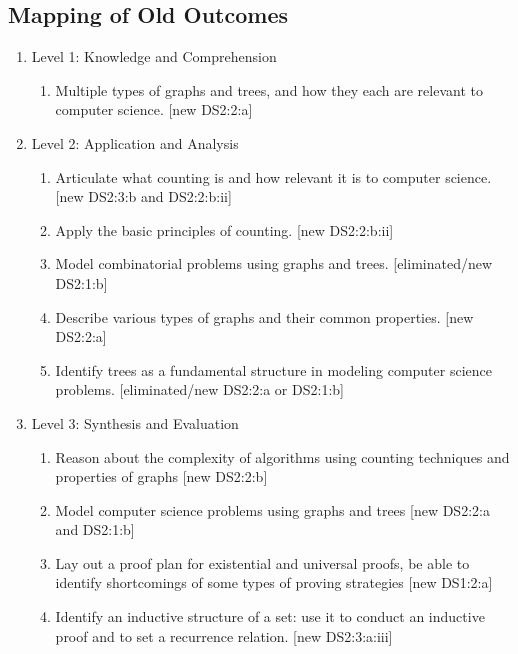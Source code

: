 \documentclass[11pt]{article}
\begin{document}
\begin{appendix}
\clearpage
\section{Mapping of Old Outcomes}
\label{app:oldOutcomeMapping}
\begin{enumerate}
\item Level 1: Knowledge and Comprehension 
	\begin{enumerate}
	\item Multiple types of graphs and trees, and how they each are relevant to computer science. {\color{red}[new DS2:2:a]}
	\end{enumerate}
\item Level 2: Application and Analysis 
	\begin{enumerate}
	\item Articulate what counting is and how relevant it is to computer science. {\color{red}[new DS2:3:b and DS2:2:b:ii]}
	\item Apply the basic principles of counting. {\color{red}[new DS2:2:b:ii]}
	\item Model combinatorial problems using graphs and trees. {\color{red}[eliminated/new DS2:1:b]}
	\item Describe various types of graphs and their common properties. {\color{red}[new DS2:2:a]}
	\item Identify trees as a fundamental structure in modeling computer science problems. {\color{red}[eliminated/new DS2:2:a or DS2:1:b]}
	\end{enumerate}
\item Level 3: Synthesis and Evaluation 
	\begin{enumerate}
	\item Reason about the complexity of algorithms using counting techniques and properties of graphs {\color{red}[new DS2:2:b]}
	\item Model computer science problems using graphs and trees {\color{red}[new DS2:2:a and DS2:1:b]}
	\item Lay out a proof plan for existential and universal proofs, be able to identify shortcomings of some types of proving strategies {\color{red}[new DS1:2:a]}
	\item Identify an inductive structure of a set: use it to conduct an inductive proof and to set a recurrence relation. {\color{red}[new DS2:3:a:iii]}
	\end{enumerate}
\end{enumerate}

\end{appendix}
\end{document}
